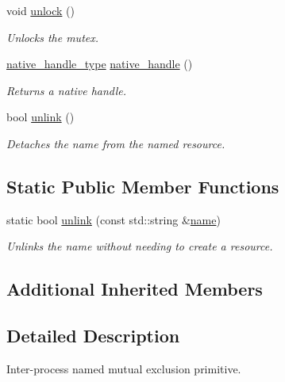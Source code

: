 \begin{DoxyCompactItemize}
void \hyperlink{classcpen333_1_1process_1_1posix_1_1mutex_a822e51a57ea9e5de1a052aeddf3e4e02}{unlock} ()
\begin{DoxyCompactList}\small\item\em Unlocks the mutex. \end{DoxyCompactList}\item 
\hyperlink{classcpen333_1_1process_1_1posix_1_1mutex_aac6d3675fcffc52ddf281e952968e44b}{native\+\_\+handle\+\_\+type} \hyperlink{classcpen333_1_1process_1_1posix_1_1mutex_aa36462cbd2181e20caa35656c619c6dd}{native\+\_\+handle} ()
\begin{DoxyCompactList}\small\item\em Returns a native handle. \end{DoxyCompactList}\item 
bool \hyperlink{classcpen333_1_1process_1_1posix_1_1mutex_ac1bcf9576d7470e5d64e17876c9cdb36}{unlink} ()
\begin{DoxyCompactList}\small\item\em Detaches the name from the named resource. \end{DoxyCompactList}\end{DoxyCompactItemize}
\subsection*{Static Public Member Functions}
\begin{DoxyCompactItemize}
\item 
static bool \hyperlink{classcpen333_1_1process_1_1posix_1_1mutex_ae5750c148e0408daac498a87d2d9a579}{unlink} (const std\+::string \&\hyperlink{classcpen333_1_1process_1_1impl_1_1named__resource__base_a53986a0a1dd26a3602b842c45613b79d}{name})
\begin{DoxyCompactList}\small\item\em Unlinks the name without needing to create a resource. \end{DoxyCompactList}\end{DoxyCompactItemize}
\subsection*{Additional Inherited Members}


\subsection{Detailed Description}
Inter-\/process named mutual exclusion primitive. 


